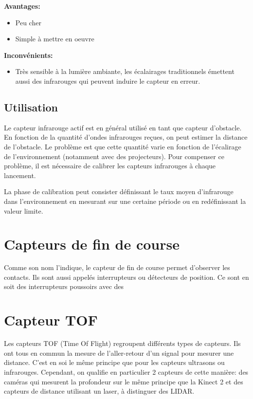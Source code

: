 \documentclass[a4paper, 11pt]{report}
\begin{document}
\textbf{Avantages:}
\begin{itemize}
\item Peu cher
\item Simple à mettre en oeuvre
\end{itemize}

\textbf{Inconvénients:}
\begin{itemize}
\item Très sensible à la lumière ambiante, les écalairages traditionnels émettent aussi des infrarouges qui peuvent induire le capteur en erreur.
\end{itemize}

\subsection{Utilisation}
Le capteur infrarouge actif est en général utilisé en tant que capteur d'obstacle. En fonction de la quantité d'ondes infrarouges reçues, on peut estimer la distance de l'obstacle. Le problème est que cette quantité varie en fonction de l'écalirage de l'environnement (notamment avec des projecteurs). Pour compenser ce problème, il est nécessaire de calibrer les capteurs infrarouges à chaque lancement.

La phase de calibration peut consister définissant le taux moyen d'infrarouge dans l'environnement en mesurant sur une certaine période ou en redéfinissant la valeur limite.

\section{Capteurs de fin de course}
Comme son nom l'indique, le capteur de fin de course permet d'observer les contacts. Ils sont aussi appelés interrupteurs ou détecteurs de position. Ce sont en soit des interrupteurs poussoirs avec des 

\section{Capteur TOF}
Les capteurs TOF (Time Of Flight) regroupent différents types de capteurs. Ils ont tous en commun la mesure de l'aller-retour d'un signal pour mesurer une distance. C'est en soi le même principe que pour les capteurs ultrasons ou infrarouges. Cependant, on qualifie en particulier 2 capteurs de cette manière: des caméras qui mesurent la profondeur sur le même principe que la Kinect 2 et des capteurs de distance utilisant un laser, à distinguer des LIDAR.
\end{document}
